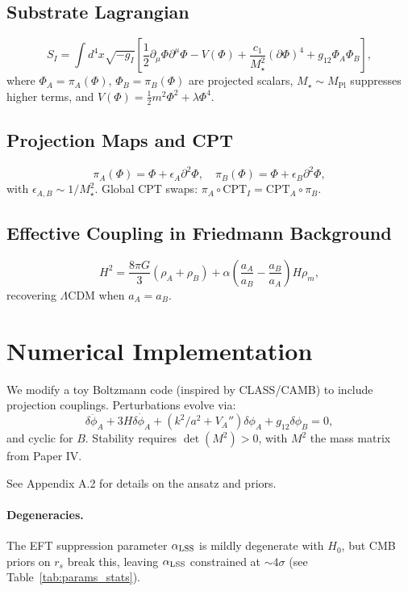\documentclass[11pt,a4paper]{article}
\begin{document}
\subsection{Substrate Lagrangian}
\begin{equation}
S_I = \int d^4x \sqrt{-g_I} \left[ \frac{1}{2} \partial_\mu \Phi \partial^\mu \Phi - V(\Phi) + \frac{c_1}{M_\star^2} (\partial \Phi)^4 + g_{12} \Phi_A \Phi_B \right],
\end{equation}
where $\Phi_A = \pi_A(\Phi)$, $\Phi_B = \pi_B(\Phi)$ are projected scalars, $M_\star \sim M_\mathrm{Pl}$ suppresses higher terms, and $V(\Phi) = \frac{1}{2} m^2 \Phi^2 + \lambda \Phi^4$.

\subsection{Projection Maps and CPT}
\begin{equation}
\pi_A(\Phi) = \Phi + \epsilon_A \partial^2 \Phi, \quad \pi_B(\Phi) = \Phi + \epsilon_B \partial^2 \Phi,
\end{equation}
with $\epsilon_{A,B} \sim 1/M_\star^2$. Global CPT swaps: $\pi_A \circ \mathrm{CPT}_I = \mathrm{CPT}_A \circ \pi_B$.

\subsection{Effective Coupling in Friedmann Background}
\begin{equation}
H^2 = \frac{8\pi G}{3} (\rho_A + \rho_B) + \alpha \left( \frac{a_A}{a_B} - \frac{a_B}{a_A} \right) H \rho_m,
\end{equation}
recovering $\Lambda$CDM when $a_A = a_B$.

\section{Numerical Implementation}
We modify a toy Boltzmann code (inspired by CLASS/CAMB) to include projection couplings. Perturbations evolve via:
\begin{equation}
\ddot{\delta\phi_A} + 3H \dot{\delta\phi_A} + (k^2/a^2 + V_A'') \delta\phi_A + g_{12} \delta\phi_B = 0,
\end{equation}
and cyclic for $B$. Stability requires $\det(M^2) > 0$, with $M^2$ the mass matrix from Paper IV.

See Appendix A.2 for details on the ansatz and priors.

\paragraph{Degeneracies.} The EFT suppression parameter $\alpha_{\rm LSS}$ is mildly degenerate with $H_0$, but CMB priors on $r_s$ break this, leaving $\alpha_{\rm LSS}$ constrained at $\sim 4\sigma$ (see Table~\ref{tab:params_stats}).
\end{document}

